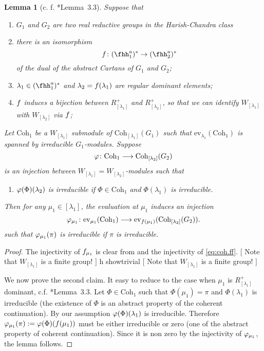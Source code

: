\documentclass[12pt,a4paper]{amsart}
\newcommand{\trivial}[2][]{\if\relax\detokenize{#1}\relax
  {%
      \color{orange} \vspace{0em} $[$  #2 $]$
      \color{black}
  }
  \else
\ifx#1h
\ifcsname showtrivial\endcsname
{%
    \color{orange} \vspace{0em}  $[$ #2 $]$
    \color{black}
}
\fi
\else {\red Wrong argument!} \fi
\fi
}
\numberwithin{equation}{section}
\newtheorem{lem}[thm]{Lemma}
\theoremstyle{remark}
\def\Coh{\mathrm{Coh}}
\def\ev#1{{\mathrm{ev}_{#1}}}
\begin{document}
\begin{lem}[{c. f. \cite{GI}*{Lemma~3.3}}]\label{lem:ff.irr}
  Suppose that
  \begin{enumerate}[label=(\roman*),series=KLff]
    \item \label{it:KLff.1} $G_{1}$ and $G_{2}$ are two real reductive groups in
          the Harish-Chandra class
          \item there is an isomorphism
          \[ \ff\colon \fhhaso\rightarrow \fhhast
          \]
          of the dual of the abstract Cartans of $G_{1}$ and $G_{2}$;
    \item $\lambda_{1} \in \fhhaso$ and $\lambda_{2} = f(\lambda_{1})$ are
          regular dominant elements;
    \item \label{it:KLff.4} $f$ induces a bijection between
          $R^{+}_{[\lambda_{1}]}$ and $R^{+}_{[\lambda_{2}]}$, so that we can
          identify $W_{[\lambda_{1}]}$ with $W_{[\lambda_{2}]}$ via $f$;
  \end{enumerate}
  Let $\Coh_{1}$ be a $W_{[\lambda_{1}]}$ submodule of
  $\Coh_{[\lambda_{1}]}(G_{1})$ such that $\ev{\lambda_{1}}(\Coh_{1})$ is
  spanned by irreducible $G_{1}$-modules. Suppose
  \begin{equation}\label{eq:coh.ff}
    \ffcoh\colon \Coh_{1}\longrightarrow \Coh_{[\lambda_{2}]}(G_{2})
  \end{equation}
  is an injection between $W_{[\lambda_{1}]}=W_{[\lambda_{2}]}$-modules such
  that
  \begin{enumerate}[KLff]
    \item \label{it:KLff.5} $\varphi(\Phi)(\lambda_{2})$ is irreducible if $\Phi\in \Coh_{1}$
          and $\Phi(\lambda_{1})$ is irreducible.
  \end{enumerate}

  Then for any $\mu_{1}\in [\lambda_{1}]$, the evaluation at $\mu_{1}$ induces
  an injection
  \[
    \ffcoh_{\mu_{1}} \colon \ev{\mu_{1}}(\Coh_{1}) \longrightarrow \ev{\ff(\mu_{1})}(\Coh_{[\lambda_{2}]}(G_{2})).
  \]
  such that $\varphi_{\mu_{1}}(\pi)$ is irreducible if $\pi$ is irreducible.
\end{lem}
\begin{proof}
  The injectivity of $f_{\mu_{1}}$ is clear from  and the
  injectivity of \eqref{eq:coh.ff}. \trivial[]{Note that $W_{[\lambda_{1}]}$ is a
    finite group!}

  We now prove the second claim. It easy to reduce to the case when $\mu_{1}$ is
  $R^{+}_{[\lambda_{1}]}$ dominant, c.f. \cite{GI}*{Lemma~3.3}.
  Let $\Phi\in \Coh_{1}$ such that
  $\Phi(\mu_{1})=\pi$ and $\Phi(\lambda_{1})$ is irreducible (the existence
  of $\Phi$ is an abstract property of the coherent continuation). By our
  assumption $\varphi(\Phi)(\lambda_{1})$ is irreducible. Therefore
  $\varphi_{\mu_{1}}(\pi):=\varphi(\Phi)(f(\mu_{1}))$ must be either
  irreducible or zero (one of the abstract property of coherent continuation).
  Since it is non zero by the injectivity  of $\varphi_{\mu_{1}}$, the lemma
  follows.
\end{proof}
\end{document}
